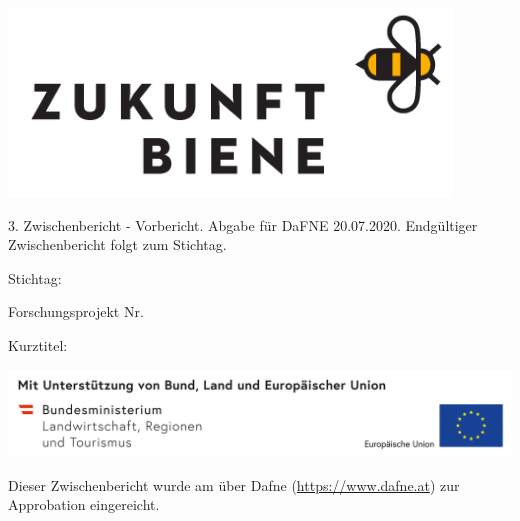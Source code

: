 \begin{titlepage}

\begin{center}

\includegraphics[height=50mm]{figures/logos/zukunft_biene_logo_rechteck}

\vfill\vfill\vfill
\vfill\vfill\vfill

{\large 3. Zwischenbericht - Vorbericht. Abgabe für DaFNE 20.07.2020. Endgültiger Zwischenbericht folgt zum Stichtag.}

\vfill
Stichtag: \mydeadlinedate

\vfill\vfill\vfill

Forschungsprojekt Nr. \myprojectnumber

\vfill\vfill\vfill
\vfill\vfill\vfill

{\LARGE\textbf{\mytitle}\par}

\vfill
Kurztitel: {\bfseries\large\mysubtitle}

\vfill\vfill\vfill

\vspace*{\fill}
\includegraphics[width=\textwidth]{figures/logos/5_Foeg_Leiste_Bund+Land+EU_2020_RGB_leer}

\newpage

\vspace*{\fill}

Dieser Zwischenbericht wurde am {\mysubmissiondate} über Dafne (\url{https://www.dafne.at}) zur Approbation eingereicht. 

\end{center}
\end{titlepage}

